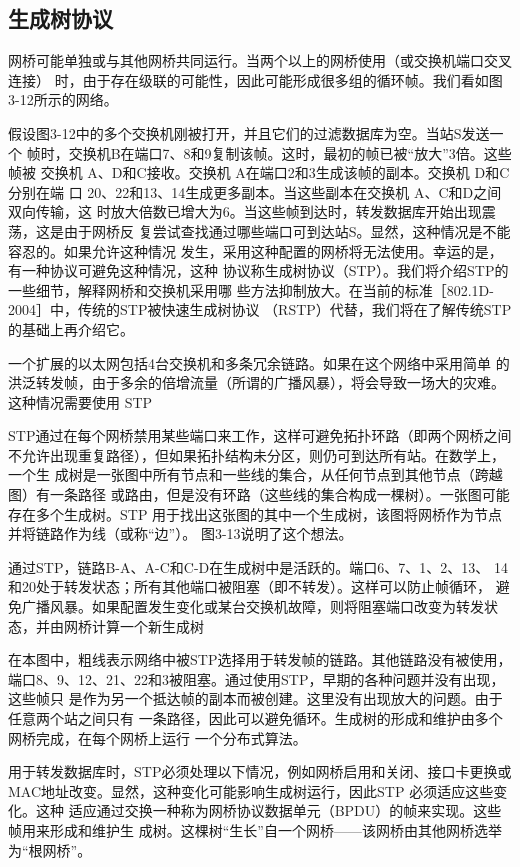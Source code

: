 \subsection{生成树协议}

网桥可能单独或与其他网桥共同运行。当两个以上的网桥使用（或交换机端口交叉连接）
时，由于存在级联的可能性，因此可能形成很多组的循环帧。我们看如图3-12所示的网络。

假设图3-12中的多个交换机刚被打开，并且它们的过滤数据库为空。当站S发送一个
帧时，交换机B在端口7、8和9复制该帧。这时，最初的帧已被“放大”3倍。这些帧被
交换机 A、D和C接收。交换机 A在端口2和3生成该帧的副本。交换机 D和C分别在端
口 20、22和13、14生成更多副本。当这些副本在交换机 A、C和D之间双向传输，这
时放大倍数已增大为6。当这些帧到达时，转发数据库开始出现震荡，这是由于网桥反
复尝试查找通过哪些端口可到达站S。显然，这种情况是不能容忍的。如果允许这种情况
发生，采用这种配置的网桥将无法使用。幸运的是，有一种协议可避免这种情况，这种
协议称生成树协议（STP）。我们将介绍STP的一些细节，解释网桥和交换机采用哪
些方法抑制放大。在当前的标准［802.1D-2004］中，传统的STP被快速生成树协议
（RSTP）代替，我们将在了解传统STP的基础上再介绍它。

一个扩展的以太网包括4台交换机和多条冗余链路。如果在这个网络中采用简单
的洪泛转发帧，由于多余的倍增流量（所谓的广播风暴），将会导致一场大的灾难。
这种情况需要使用 STP


STP通过在每个网桥禁用某些端口来工作，这样可避免拓扑环路（即两个网桥之间
不允许出现重复路径），但如果拓扑结构未分区，则仍可到达所有站。在数学上，一个生
成树是一张图中所有节点和一些线的集合，从任何节点到其他节点（跨越图）有一条路径
或路由，但是没有环路（这些线的集合构成一棵树）。一张图可能存在多个生成树。STP
用于找出这张图的其中一个生成树，该图将网桥作为节点并将链路作为线（或称“边”）。
图3-13说明了这个想法。

通过STP，链路B-A、A-C和C-D在生成树中是活跃的。端口6、7、1、2、13、
14和20处于转发状态；所有其他端口被阻塞（即不转发）。这样可以防止帧循环，
避免广播风暴。如果配置发生变化或某台交换机故障，则将阻塞端口改变为转发状
态，并由网桥计算一个新生成树

在本图中，粗线表示网络中被STP选择用于转发帧的链路。其他链路没有被使用，
端口8、9、12、21、22和3被阻塞。通过使用STP，早期的各种问题并没有出现，这些帧只
是作为另一个抵达帧的副本而被创建。这里没有出现放大的问题。由于任意两个站之间只有
一条路径，因此可以避免循环。生成树的形成和维护由多个网桥完成，在每个网桥上运行
一个分布式算法。

用于转发数据库时，STP必须处理以下情况，例如网桥启用和关闭、接口卡更换或
MAC地址改变。显然，这种变化可能影响生成树运行，因此STP 必须适应这些变化。这种
适应通过交换一种称为网桥协议数据单元（BPDU）的帧来实现。这些帧用来形成和维护生
成树。这棵树“生长”自一个网桥——该网桥由其他网桥选举为“根网桥”。

